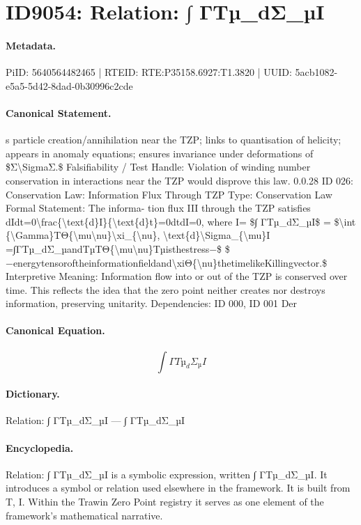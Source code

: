 \section*{ID9054: Relation: ∫ ΓTµ\_dΣ\_µI}
\paragraph{Metadata.}
PiID: 5640564482465 | RTEID: RTE:P35158.6927:T1.3820 | UUID: 5acb1082-e5a5-5d42-8dad-0b30996c2cde

\paragraph{Canonical Statement.}
s particle creation/annihilation near the TZP; links to quantisation of helicity; appears in anomaly equations; ensures invariance under deformations of \$Σ\textbackslash{}SigmaΣ.\$ Falsifiability / Test Handle: Violation of winding number conservation in interactions near the TZP would disprove this law. 0.0.28 ID 026: Conservation Law: Information Flux Through TZP Type: Conservation Law Formal Statement: The informa- tion flux III through the TZP satisfies dIdt=0\textbackslash{}frac\{\textbackslash{}text\{d\}I\}\{\textbackslash{}text\{d\}t\}=0dtdI=0, where I= \$∫ ΓTµ\_dΣ\_µI\$ = \$\textbackslash{}int \{\textbackslash{}Gamma\}TΘ\{\textbackslash{}mu\textbackslash{}nu\}\textbackslash{}xi\_\{\textbackslash{}nu\}, \textbackslash{}text\{d\}\textbackslash{}Sigma\_\{\textbackslash{}mu\}I =∫ΓTµ\_dΣ\_µandTµTΘ\{\textbackslash{}mu\textbackslash{}nu\}Tµisthestress−\$ \$−energytensoroftheinformationfieldand\textbackslash{}xiΘ\{\textbackslash{}nu\}thetimelikeKillingvector.\$ Interpretive Meaning: Information flow into or out of the TZP is conserved over time. This reflects the idea that the zero point neither creates nor destroys information, preserving unitarity. Dependencies: ID 000, ID 001 Der

\paragraph{Canonical Equation.}
\[
∫ ΓTµ_dΣ_µI
\]

\paragraph{Dictionary.}
Relation: ∫ ΓTµ\_dΣ\_µI — ∫ ΓTµ\_dΣ\_µI

\paragraph{Encyclopedia.}
Relation: ∫ ΓTµ\_dΣ\_µI is a symbolic expression, written ∫ ΓTµ\_dΣ\_µI. It introduces a symbol or relation used elsewhere in the framework. It is built from T, I. Within the Trawin Zero Point registry it serves as one element of the framework's mathematical narrative.
